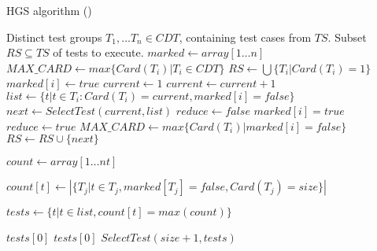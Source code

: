 \clearpage

\begin{algorithm}[ht!]
\caption{HGS algorithm (\cite{hgs})}
\label{alg:hgs}
\begin{algorithmic}[1]
	 Distinct test groups $T_1, \dots T_n \in CDT$, containing test cases from $TS$.
	 Subset $RS \subseteq TS$ of tests to execute.
	\State $marked \gets array[1 \dots n]$ 
	\State $MAX\_CARD \gets max \{Card(T_i) \vert T_i \in CDT\}$
	\State $RS \gets \bigcup \{ T_i \vert Card(T_i) = 1 \}$
			$marked[i] \gets true$
		\EndIf
	\EndFor
	\State $current \gets 1$
		\State $current \gets current + 1$
			\State $list \gets \{t \vert t \in T_i : Card(T_i) = current, marked[i] = false\}$
			\State $next \gets SelectTest(current, list)$
			\State $reduce \gets false$
					\State $marked[i] = true$
						$reduce \gets true$
					\EndIf
				\EndIf
			\EndFor
				\State $MAX\_CARD \gets max \{Card(T_i) \vert marked[i] = false\}$
			\EndIf
			\State $RS \gets RS \cup \{next\}$
		\EndWhile
	\EndWhile
	
		\State $count\gets array[1 \dots nt]$
		
			\State $count[t] \gets |\{T_j \vert t \in T_j, marked[T_j] = false, Card(T_j) = size\}|$
		\EndFor
		
		\State $tests \gets \{t \vert t \in list, count[t] = max(count) \}$
		
			\Return $tests[0]$
			\Return $tests[0]$
		\Else{}
			\Return $SelectTest(size+1, tests)$
		\EndIf
	\EndFunction
\end{algorithmic}
\end{algorithm}